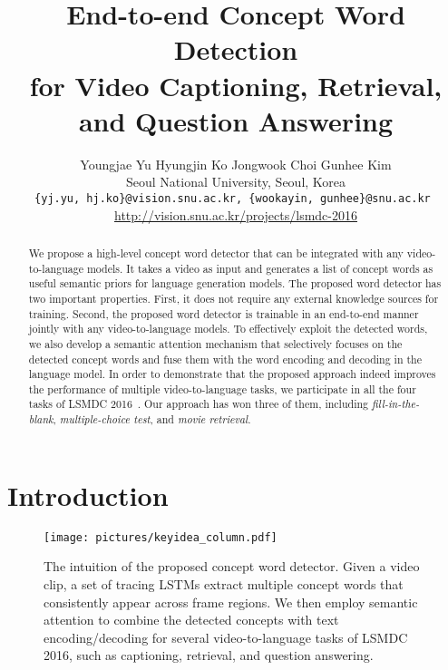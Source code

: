 \documentclass[10pt,twocolumn,letterpaper]{article}
\theoremstyle{nonumberplain}
\begin{document}
\title{End-to-end Concept Word Detection \\for Video Captioning, Retrieval, and Question Answering} 

\author{Youngjae Yu \hspace{9pt} Hyungjin Ko \hspace{9pt}  Jongwook Choi \hspace{9pt} Gunhee Kim \\
Seoul National University, Seoul, Korea\\
{\tt\small \{yj.yu, hj.ko\}@vision.snu.ac.kr, \{wookayin, gunhee\}@snu.ac.kr } \\
{\small \url{http://vision.snu.ac.kr/projects/lsmdc-2016}}
}

\maketitle\thispagestyle{empty}

\begin{abstract}
We propose a high-level concept word detector that can be integrated with any video-to-language models.
It takes a video as input and generates a list of concept words as useful semantic priors for language generation models.
The proposed word detector has two important properties. First, it does not require any external knowledge sources for training.
Second, the proposed word detector is trainable in an end-to-end manner jointly with any video-to-language models.
To effectively exploit the detected words,
we also develop a semantic attention mechanism that selectively focuses on the detected concept words and fuse them with the word encoding and decoding in the language model.
In order to demonstrate that the proposed approach indeed improves the performance of multiple video-to-language tasks,
we participate in all the four tasks of LSMDC 2016~\cite{rohrbach-ijcv-2017}.
Our approach has won three of them, including \textit{fill-in-the-blank}, \textit{multiple-choice test}, and \textit{movie retrieval}.
\end{abstract}



\vspace{-5pt}
\section{Introduction}
\label{sec:introduction}

\begin{figure}[t]
\centering
\texttt{[image: pictures/keyidea\_column.pdf]}
\caption{The intuition of the proposed concept word detector. Given a video clip,
    a set of tracing LSTMs extract multiple concept words that consistently appear across frame regions.
    We then employ semantic attention to combine the detected concepts with text encoding/decoding
    for several video-to-language tasks of LSMDC 2016, such as captioning, retrieval, and question answering.
}
\vspace{-5pt}
\label{fig:keyidea}
\end{figure}
\end{document}
